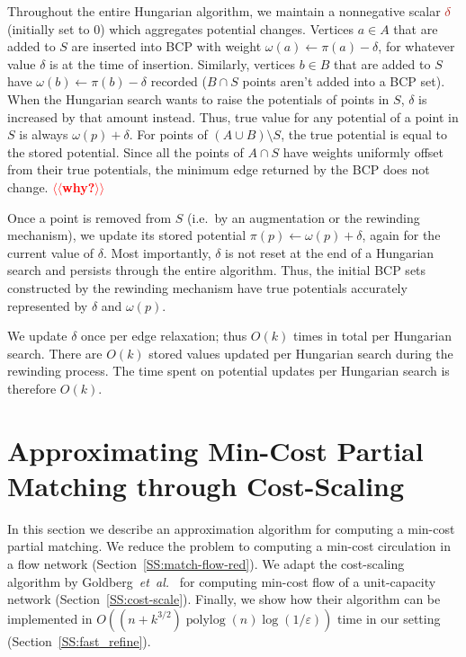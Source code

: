 \documentclass[a4paper,UKenglish]{socg-lipics-v2018}
\makeatletter
\def\etal{\emph{et~al.}}
\def\etal{\textit{et~al.}}
\def\polylog{\mathop{\mathrm{polylog}}}
\def\eps{\varepsilon}
\def\Paren#1{\left( #1 \right)}		%
\theoremstyle{plain}
\numberwithin{figure}{section}
\def\EMPH#1{\textcolor{BrickRed}{{\emph{#1}}}}
\def\n@te#1{\textsf{\boldmath \textbf{$\langle\!\langle$#1$\rangle\!\rangle$}}\leavevmode}
\def\note#1{\textcolor{red}{\n@te{#1}}}
\makeatother
\begin{document}
Throughout the entire Hungarian algorithm, we maintain a nonnegative scalar
$\EMPH{$\delta$}$ (initially set to $0$) which aggregates potential changes.
Vertices $a \in A$ that are added to $S$ are inserted into BCP with weight
$\omega(a) \gets \pi(a) - \delta$, for whatever value $\delta$ is at the time
of insertion.
Similarly, vertices $b \in B$ that are added to $S$ have $\omega(b) \gets \pi(b) - \delta$
recorded ($B \cap S$ points aren't added into a BCP set).
When the Hungarian search wants to raise the potentials of points in $S$,
$\delta$ is increased by that amount instead.
Thus, true value for any potential of a point in $S$ is always $\omega(p) + \delta$.
For points of $(A \cup B) \setminus S$, the true potential is equal to the
stored potential.
Since all the points of $A \cap S$ have weights uniformly offset from their
true potentials, the minimum edge returned by the BCP does not change. \note{why?}

Once a point is removed from $S$ (i.e.\ by an augmentation or the rewinding
mechanism), we update its stored potential $\pi(p) \gets \omega(p) + \delta$,
again for the current value of $\delta$.
Most importantly, $\delta$ is not reset at the end of a Hungarian search and
persists through the entire algorithm.
Thus, the initial BCP sets constructed by the rewinding mechanism have true
potentials accurately represented by $\delta$ and $\omega(p)$.

We update $\delta$ once per edge relaxation; thus $O(k)$ times in total per Hungarian search.
There are $O(k)$ stored values updated per Hungarian search during the rewinding process.
The time spent on potential updates per Hungarian search is therefore $O(k)$.


\section{Approximating Min-Cost Partial Matching through Cost-Scaling}
\label{section:goldberg}

In this section we describe an approximation algorithm for computing a min-cost
partial matching.
We reduce the problem to computing a min-cost circulation in a flow network
(Section~\ref{SS:match-flow-red}).
We adapt the cost-scaling algorithm by Goldberg~\etal~\cite{GHKT17} for
computing min-cost flow of a unit-capacity network (Section~\ref{SS:cost-scale}).
Finally, we show how their algorithm can be implemented in
$O\Paren{(n + k^{3/2})\polylog(n)\log(1/\eps)}$ time in our setting (Section~\ref{SS:fast_refine}).
\end{document}
